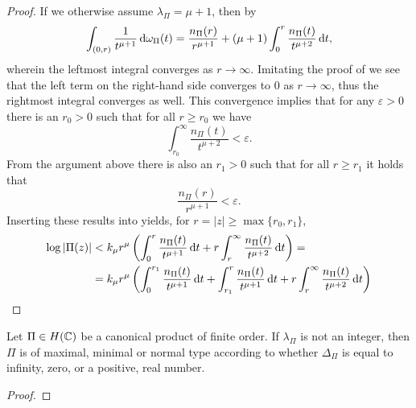 \begin{proof}
    If we otherwise assume $\lambda_\Pi = \mu + 1$, then by 
    $$ \int_{(0, r)} \frac{1}{t^{\mu + 1}} \mathop{}\!\mathrm{d} \omega_\Pi(t) = \frac{n_\Pi(r)}{r^{\mu + 1}} + (\mu + 1) \int_0^r \frac{n_\Pi(t)}{t^{\mu + 2}} \mathop{}\!\mathrm{d} t, $$
    wherein the leftmost integral converges as $r \to \infty$. Imitating the proof of  we see that the left term on the right-hand side converges to $0$ as $r \to \infty$, thus the rightmost integral converges as well. This convergence implies that for any $\varepsilon > 0$ there is an $r_0 > 0$ such that for all $r \geq r_0$ we have
    $$ \int_{r_0}^\infty \frac{n_\Pi(t)}{t^{\mu + 2}} < \varepsilon. $$
    From the argument above there is also an $r_1 > 0$ such that for all $r \geq r_1$ it holds that
    $$ \frac{n_\Pi(r)}{r^{\mu + 1}} < \varepsilon. $$
    Inserting these results into  yields, for $r = \vert z \vert \geq \max \{ r_0, r_1 \}$,
    \begin{align*}
        \log \vert \Pi(z) \vert &< k_\mu r^\mu \left( \int_0^r \frac{n_\Pi(t)}{t^{\mu + 1}} \mathop{}\!\mathrm{d} t + r \int_r^\infty \frac{n_\Pi(t)}{t^{\mu + 2}} \mathop{}\!\mathrm{d} t \right) = \\
        &= k_\mu r^\mu \left( \int_0^{r_1} \frac{n_\Pi(t)}{t^{\mu + 1}} \mathop{}\!\mathrm{d} t + \int_{r_1}^r \frac{n_\Pi(t)}{t^{\mu + 1}} \mathop{}\!\mathrm{d} t + r \int_r^\infty \frac{n_\Pi(t)}{t^{\mu + 2}} \mathop{}\!\mathrm{d} t \right)
    \end{align*}
\end{proof}

\begin{theorem} \label{thm:canonical-product-type-density}
    Let $\Pi \in H(\mathbb{C})$ be a canonical product of finite order. If $\lambda_\Pi$ is not an integer, then $\Pi$ is of maximal, minimal or normal type according to whether $\Delta_\Pi$ is equal to infinity, zero, or a positive, real number.
\end{theorem}

\begin{proof}
\end{proof}